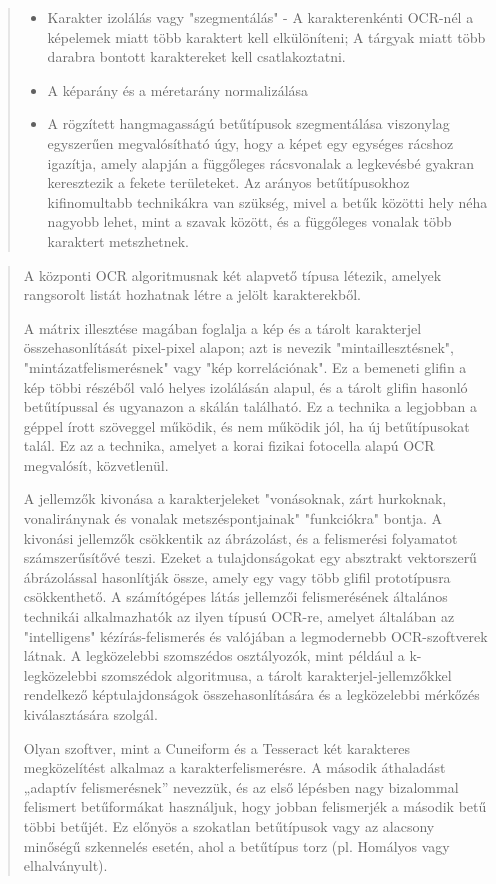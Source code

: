 \begin{quotation}
\begin{itemize}
		\item 	Karakter izolálás vagy "szegmentálás" - A karakterenkénti OCR-nél a képelemek miatt több karaktert kell elkülöníteni; A tárgyak miatt több darabra bontott karaktereket kell
		csatlakoztatni.
		
		\item A képarány és a méretarány normalizálása
		
		\item A rögzített hangmagasságú betűtípusok szegmentálása viszonylag egyszerűen megvalósítható úgy, hogy a képet egy egységes rácshoz igazítja, amely alapján a függőleges rácsvonalak a legkevésbé gyakran keresztezik a fekete területeket. Az arányos betűtípusokhoz kifinomultabb technikákra van szükség, mivel a betűk közötti hely néha nagyobb lehet, mint a szavak között, és a függőleges vonalak több karaktert metszhetnek.
	\end{itemize}
\end{quotation}

\cite{bradski2000opencv}
\begin{quotation}
	A központi OCR algoritmusnak két alapvető típusa létezik, amelyek rangsorolt listát hozhatnak létre a jelölt karakterekből.
	
	A mátrix illesztése magában foglalja a kép és a tárolt karakterjel összehasonlítását pixel-pixel alapon; azt is nevezik "mintaillesztésnek", "mintázatfelismerésnek" vagy "kép korrelációnak". Ez a bemeneti glifin a kép többi részéből való helyes izolálásán alapul, és a tárolt glifin hasonló betűtípussal és ugyanazon a skálán található. Ez a technika a legjobban a géppel írott szöveggel működik, és nem működik jól, ha új betűtípusokat talál. Ez az a technika, amelyet a korai fizikai fotocella alapú OCR megvalósít, közvetlenül.
	
	A jellemzők kivonása a karakterjeleket "vonásoknak, zárt hurkoknak, vonaliránynak és vonalak metszéspontjainak" "funkciókra" bontja. A kivonási jellemzők csökkentik az ábrázolást, és a felismerési folyamatot számszerűsítővé teszi. Ezeket a tulajdonságokat egy absztrakt vektorszerű ábrázolással hasonlítják össze, amely egy vagy több glifil prototípusra csökkenthető. A számítógépes látás jellemzői felismerésének általános technikái alkalmazhatók az ilyen típusú OCR-re, amelyet általában az "intelligens" kézírás-felismerés és valójában a legmodernebb OCR-szoftverek látnak. A legközelebbi szomszédos osztályozók, mint például a k-legközelebbi szomszédok algoritmusa, a tárolt karakterjel-jellemzőkkel rendelkező képtulajdonságok összehasonlítására és a legközelebbi mérkőzés kiválasztására szolgál.
	
	Olyan szoftver, mint a Cuneiform és a Tesseract két karakteres megközelítést alkalmaz a karakterfelismerésre. A második áthaladást „adaptív felismerésnek” nevezzük, és az első lépésben nagy bizalommal felismert betűformákat használjuk, hogy jobban felismerjék a második betű többi betűjét. Ez előnyös a szokatlan betűtípusok vagy az alacsony minőségű szkennelés esetén, ahol a betűtípus torz (pl. Homályos vagy elhalványult).
\end{quotation}

